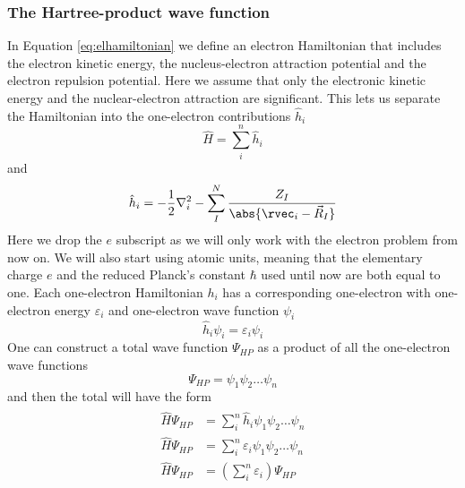 \documentclass[../master_thesis.tex]{subfiles}
\begin{document}
\subsubsection{The Hartree-product wave function} %
In Equation \ref{eq:elhamiltonian} we define an electron Hamiltonian that includes
the electron kinetic energy, the nucleus-electron attraction potential and the
electron repulsion potential. Here we assume that only the electronic kinetic energy and
the nuclear-electron attraction are significant. This lets us separate the Hamiltonian into
the one-electron contributions $\hat{h}_i$
\begin{equation}
  \hat{H} = \sum^n_{i} \hat{h}_i
\end{equation}
and
\begin{equation}
  \hat{h}_i = -\frac{1}{2}\nabla^2_i - \sum^N_I \frac{Z_I}{\abs{\rvec_i - \vec{R}_I}}
\end{equation}
Here we drop the $e$ subscript as we will only work with the electron problem
from now on. We will also start using atomic units, meaning that the elementary charge $e$ and
the reduced Planck's constant $\hbar$ used until now are both equal to one.
Each one-electron Hamiltonian $h_i$ has a corresponding one-electron \SE with
one-electron energy $\varepsilon_i$ and one-electron wave function $\psi_i$
\begin{equation}
  \hat{h}_i\psi_i = \varepsilon_i\psi_i
\end{equation}
One can construct a total wave function $\Psi_{HP}$ as a product of all the one-electron
wave functions
\begin{equation}
  \Psi_{HP} = \psi_1\psi_2\ldots\psi_n
\end{equation}
and then the total \SE  will have the form \cite{Cramer:2004}
\begin{align}
  \begin{split}
    \hat{H}\Psi_{HP} &= \sum^n_{i} \hat{h}_i\psi_1\psi_2\ldots\psi_n\\
    \hat{H}\Psi_{HP} &= \sum_i^n\varepsilon_i\psi_1\psi_2\ldots\psi_n\\
    \hat{H}\Psi_{HP} &= \left(\sum_i^n\varepsilon_i\right)\Psi_{HP}
  \end{split}
\end{align}
\end{document}
